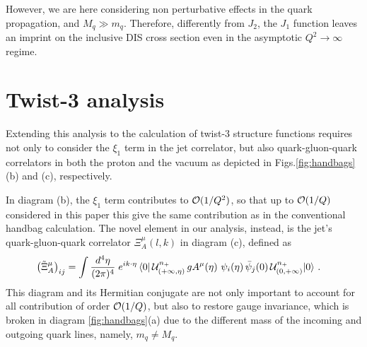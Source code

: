 \documentclass[preprintnumbers,floatfix,nofootinbib]{revtex4}
\newcommand{\todo}[1]{\marginpar{$\bullet$}\textbf{#1}}
\newcommand{\Tr}{\operatorname*{Tr}\nolimits} %
\newcommand{\de}{d}                    %
\newcommand{\ii}{i}                    %
\newcommand{\mj}{M_q}
\newcommand{\mq}{m_q}
\begin{document}
However, we are here considering non perturbative effects
in the quark propagation, and $\mj \gg \mq$. 
Therefore, differently from $J_2$, the $J_1$ function leaves an imprint on the inclusive DIS cross section even in the asymptotic $Q^2 \to \infty$ regime. 


\section{Twist-3 analysis}

Extending this analysis to the calculation of twist-3
structure functions requires not only to consider the $\xi_1$ term in the jet
correlator, but also quark-gluon-quark correlators in both the proton and the
vacuum as depicted in Figs.\ref{fig:handbags}(b) and (c), respectively. 

In diagram (b), the $\xi_1$ term contributes to ${\cal O}(1/Q^2)$, so that up to ${\cal O}(1/Q)$ considered in this paper this give the same contribution as in the conventional handbag calculation. The novel element in our analysis, instead, is the jet's quark-gluon-quark correlator $\Xi_A^{\mu}(l,k)$ in diagram (c), defined as 
\begin{equation} 
\begin{split} 
  \left(\tilde \Xi_A^{\mu} \right)_{ij} &=
   \int \frac{\de^4 \eta}{(2\pi)^{4}}\;
   e^{\ii k \cdot \eta}\,
   \langle 0|\,
   {\cal U}^{n_+}_{(+\infty,\eta)}\,
   g A^{\mu}(\eta)\,
   \,\psi_i(\eta)
   \,\bar{\psi}_j(0)\,
   {\cal U}^{n_+}_{(0,+\infty)}
   |0\rangle \ .
\label{e:xi_A}
\end{split} 
\end{equation}  
This diagram and its Hermitian conjugate are not only important to account for
all contribution of order ${\cal O}(1/Q)$, but also to restore gauge invariance, which is broken in diagram \ref{fig:handbags}(a) due to the different mass
of the incoming and outgoing quark lines, namely, $\mq \neq \mj$. 
\end{document}
